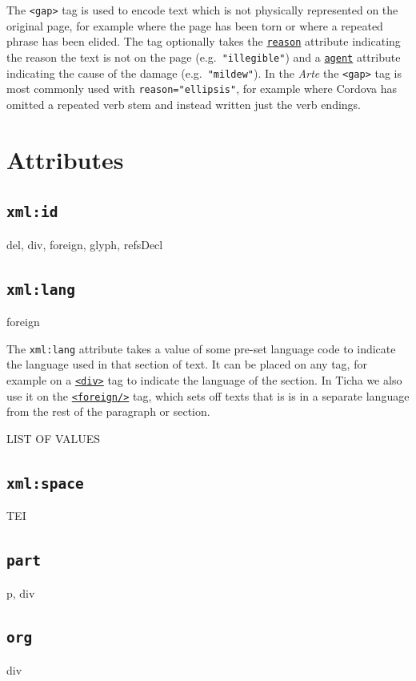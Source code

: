 \documentclass[12pt,a4paper]{article}
\begin{document}
The \texttt{<gap>} tag is used to encode text which is not physically represented on the original page, for example where the page has been torn or where a repeated phrase has been elided.  The tag optionally takes the \hyperref[att-sec:reason]{\texttt{reason}} attribute indicating the reason the text is not on the page (e.g.\ \texttt{"illegible"}) and a \hyperref[att-sec:agent]{\texttt{agent}} attribute indicating the cause of the damage (e.g.\ \texttt{"mildew"}).  In the \emph{Arte} the \texttt{<gap>} tag is most commonly used with \texttt{reason="ellipsis"}, for example where Cordova has omitted a repeated verb stem and instead written just the verb endings.


\section{Attributes}

\subsection{\texttt{xml:id}} \label{att-sec:xml:id}
del, div, foreign, glyph, refsDecl

\subsection{\texttt{xml:lang}} \label{att-sec:xml:lang}
foreign

The \texttt{xml:lang} attribute takes a value of some pre-set language code to indicate the language used in that section of text.  It can be placed on any tag, for example on a \hyperref[tag-sec:div]{\texttt{<div>}} tag to indicate the language of the section.  In Ticha we also use it on the \hyperref[tag-sec:foreign]{\texttt{<foreign/>}} tag, which sets off texts that is is in a separate language from the rest of the paragraph or section.

LIST OF VALUES

\subsection{\texttt{xml:space}} \label{att-sec:xml:space}
TEI

\subsection{\texttt{part}} \label{att-sec:part}
p, div

\subsection{\texttt{org}} \label{att-sec:org}
div
\end{document}
